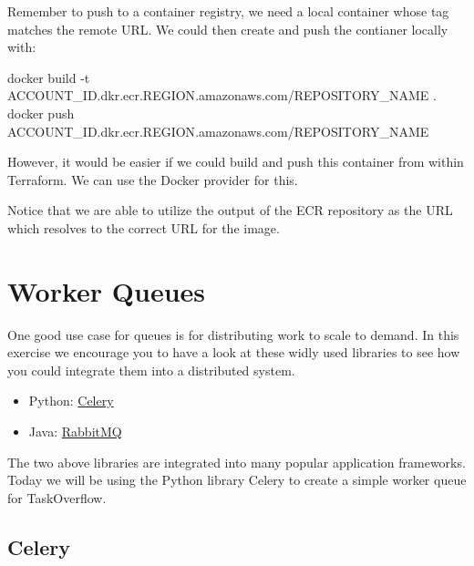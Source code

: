 \documentclass{csse4400}
\begin{document}
Remember to push to a container registry,
we need a local container whose tag matches the remote URL.
We could then create and push the contianer locally with:

\begin{code}[language=bash,numbers=none]{}
docker build -t {ACCOUNT_ID}.dkr.ecr.{REGION}.amazonaws.com/{REPOSITORY_NAME} .
docker push {ACCOUNT_ID}.dkr.ecr.{REGION}.amazonaws.com/{REPOSITORY_NAME} 
\end{code}

However, it would be easier if we could build and push this container from within Terraform.
We can use the Docker provider for this.


Notice that we are able to utilize the output of the ECR repository as the URL which resolves to the correct URL for the image.

\section{Worker Queues}

One good use case for queues is for distributing work to scale to demand.
In this exercise we encourage you to have a look at these widly used libraries to see how you could integrate them into a distributed system.

\begin{itemize}
  \item Python: \href{https://docs.celeryq.dev/en/stable/}{Celery}
  \item Java: \href{https://www.rabbitmq.com/tutorials/tutorial-one-java.html}{RabbitMQ}
\end{itemize}

The two above libraries are integrated into many popular application frameworks.
Today we will be using the Python library Celery to create a simple worker queue for TaskOverflow.

\subsection{Celery}
\end{document}

